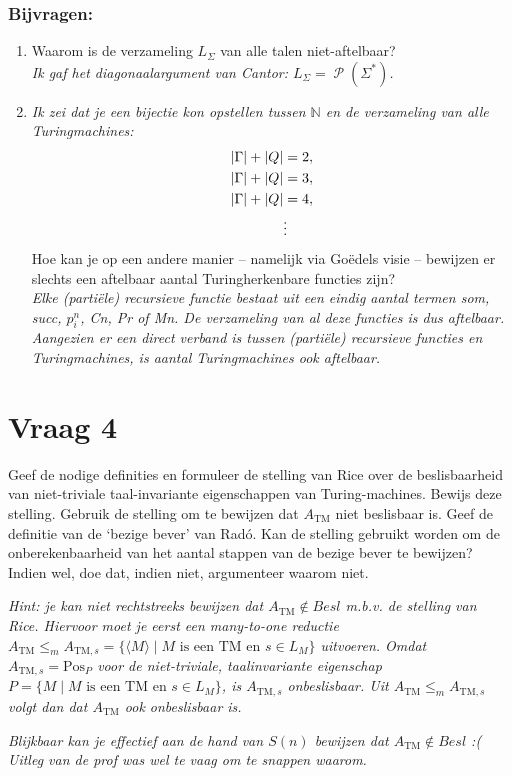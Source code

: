 \documentclass[kulak]{kulakarticle}
\newcommand{\N}{\mathbb{N}}
\DeclareMathOperator{\powerset}{\mathcal{P}}
\DeclarePairedDelimiter\abs{\lvert}{\rvert}
\begin{document}
	\subsubsection*{Bijvragen:}
	\begin{enumerate}
		\item Waarom is de verzameling \(L_\Sigma\) van alle talen niet-aftelbaar?\\ \textit{Ik gaf het diagonaalargument van Cantor: \(L_\Sigma = \powerset({\Sigma^*})\).}
		\item \textit{Ik zei dat je een bijectie kon opstellen tussen \(\N\) en de verzameling van alle Turingmachines:} \begin{align*}
			\abs{\Gamma} + \abs{Q} &= 2,\\
			\abs{\Gamma} + \abs{Q} &= 3,\\
			\abs{\Gamma} + \abs{Q} &= 4,\\
									& \vdots
		\end{align*}
		Hoe kan je op een andere manier -- namelijk via Goëdels visie -- bewijzen er slechts een aftelbaar aantal Turingherkenbare functies zijn?\\
		\textit{Elke (partiële) recursieve functie bestaat uit een eindig aantal termen som, succ, \(p^n_i\), Cn, Pr of Mn. De verzameling van al deze functies is dus aftelbaar. Aangezien er een direct verband is tussen (partiële) recursieve functies en Turingmachines, is aantal Turingmachines ook aftelbaar.}
	\end{enumerate}

	\newpage

	\section*{Vraag 4}

	Geef de nodige definities en formuleer de stelling van Rice over de beslisbaarheid van niet-triviale taal-invariante eigenschappen van Turing-machines. Bewijs deze stelling. Gebruik de stelling om te bewijzen dat \(A_\text{TM}\) niet beslisbaar is. Geef de definitie van de `bezige bever' van Radó. Kan de stelling gebruikt worden om de onberekenbaarheid van het aantal stappen van de bezige bever te bewijzen? Indien wel, doe dat, indien niet, argumenteer waarom niet.

	\textit{Hint: je kan niet rechtstreeks bewijzen dat \(A_\text{TM} \notin Besl\) m.b.v. de stelling van Rice. Hiervoor moet je eerst een many-to-one reductie \(A_\text{TM} \leq_m A_{\text{TM},s}=\{\langle M \rangle \mid M \text{ is een TM en } s \in L_M\}\) uitvoeren. Omdat \(A_{\text{TM},s} = \text{Pos}_P\) voor de niet-triviale, taalinvariante eigenschap \(P = \{M \mid M \text{ is een TM en } s \in L_M\}\), is \(A_{\text{TM},s}\) onbeslisbaar. Uit \(A_\text{TM} \leq_m A_{\text{TM},s}\) volgt dan dat \(A_\text{TM}\) ook onbeslisbaar is.}

	\textit{Blijkbaar kan je effectief aan de hand van \(S(n)\) bewijzen dat \(A_{\text{TM}} \notin Besl\) :( \\ Uitleg van de prof was wel te vaag om te snappen waarom.}
\end{document}
